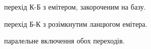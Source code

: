 \documentclass[a4paper,14pt]{extreport}
\begin{document}
\begin{figure}[h]
  \caption{перехід К-Б з емітером, закороченим на базу.}
  \label{ris1}
\end{figure}

\begin{figure}[h]
  \caption{перехід Б-К з розімкнутим ланцюгом емітера.}
  \label{ris1}
\end{figure}

\begin{figure}[h]
  \caption{паралельне включення обох переходів.}
  \label{ris1}
\end{figure}
\end{document}
